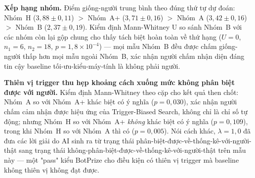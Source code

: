 \documentclass[10pt,conference]{article}
\begin{document}
\textbf{Xếp hạng nhóm.} Điểm giống-người trung bình theo đúng thứ tự dự
đoán: Nhóm~H ($3,88 \pm 0,11$) $>$ Nhóm~A+ ($3,71 \pm 0,16$) $>$
Nhóm~A ($3,42 \pm 0,16$) $>$ Nhóm~B ($2,37 \pm 0,19$). Kiểm định
Mann-Whitney U so sánh Nhóm~B với các nhóm còn lại gộp chung cho thấy
tách biệt hoàn toàn về thứ hạng ($U=0$, $n_1=6$, $n_2=18$,
$p=1,8\times10^{-4}$) — mọi mẫu Nhóm~B đều được chấm giống-người thấp
hơn mọi mẫu ngoài Nhóm~B, xác nhận người chấm nhận diện đáng tin cậy
baseline tối-ưu-kiểu-máy-tính là không phải người.

\textbf{Thiên vị trigger thu hẹp khoảng cách xuống mức không phân biệt
được với người.} Kiểm định Mann-Whitney theo cặp cho kết quả then chốt:
Nhóm~A so với Nhóm~A+ khác biệt có ý nghĩa ($p=0,030$), xác nhận người
chấm cảm nhận được hiệu ứng của Trigger-Biased Search, không chỉ là chỉ
số tự động; nhưng Nhóm~H so với Nhóm~A+ \emph{không} khác biệt có ý
nghĩa ($p=0,109$), trong khi Nhóm~H so với Nhóm~A thì có ($p=0,005$).
Nói cách khác, $\lambda=1,0$ đã đưa các lời giải do AI sinh ra từ trạng
thái phân-biệt-được-về-thống-kê-với-người-thật sang trạng thái
không-phân-biệt-được-về-thống-kê-với-người-thật trên mẫu này — một
"pass" kiểu BotPrize cho điều kiện có thiên vị trigger mà baseline
không thiên vị không đạt được.
\end{document}
